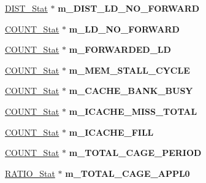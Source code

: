 \begin{DoxyCompactItemize}
\item 
\hypertarget{classall__stats__c_a616c8bd3e414d335b275bad86d8082dc}{
\hyperlink{classDIST__Stat}{DIST\_\-Stat} $\ast$ {\bfseries m\_\-DIST\_\-LD\_\-NO\_\-FORWARD}}
\label{classall__stats__c_a616c8bd3e414d335b275bad86d8082dc}

\item 
\hypertarget{classall__stats__c_aaf0c730a2a74041bd8b6f7363070812a}{
\hyperlink{classCOUNT__Stat}{COUNT\_\-Stat} $\ast$ {\bfseries m\_\-LD\_\-NO\_\-FORWARD}}
\label{classall__stats__c_aaf0c730a2a74041bd8b6f7363070812a}

\item 
\hypertarget{classall__stats__c_ad7444e5e6f9360098f9bfe9141fe182a}{
\hyperlink{classCOUNT__Stat}{COUNT\_\-Stat} $\ast$ {\bfseries m\_\-FORWARDED\_\-LD}}
\label{classall__stats__c_ad7444e5e6f9360098f9bfe9141fe182a}

\item 
\hypertarget{classall__stats__c_a40b3da12c776563c2eb95be7bd160dca}{
\hyperlink{classCOUNT__Stat}{COUNT\_\-Stat} $\ast$ {\bfseries m\_\-MEM\_\-STALL\_\-CYCLE}}
\label{classall__stats__c_a40b3da12c776563c2eb95be7bd160dca}

\item 
\hypertarget{classall__stats__c_a4ff99c146cff8aa1e8aedfa2e5ab3f8b}{
\hyperlink{classCOUNT__Stat}{COUNT\_\-Stat} $\ast$ {\bfseries m\_\-CACHE\_\-BANK\_\-BUSY}}
\label{classall__stats__c_a4ff99c146cff8aa1e8aedfa2e5ab3f8b}

\item 
\hypertarget{classall__stats__c_acfa20b6ae27d9f98561ccf504a49b5b6}{
\hyperlink{classCOUNT__Stat}{COUNT\_\-Stat} $\ast$ {\bfseries m\_\-ICACHE\_\-MISS\_\-TOTAL}}
\label{classall__stats__c_acfa20b6ae27d9f98561ccf504a49b5b6}

\item 
\hypertarget{classall__stats__c_a6996f21ad338115c6ec23be2c955cb98}{
\hyperlink{classCOUNT__Stat}{COUNT\_\-Stat} $\ast$ {\bfseries m\_\-ICACHE\_\-FILL}}
\label{classall__stats__c_a6996f21ad338115c6ec23be2c955cb98}

\item 
\hypertarget{classall__stats__c_aaf156c003e2c721eb14559cc8af72f18}{
\hyperlink{classCOUNT__Stat}{COUNT\_\-Stat} $\ast$ {\bfseries m\_\-TOTAL\_\-CAGE\_\-PERIOD}}
\label{classall__stats__c_aaf156c003e2c721eb14559cc8af72f18}

\item 
\hypertarget{classall__stats__c_abd5b8d4359cf89624e166594f05c2be0}{
\hyperlink{classRATIO__Stat}{RATIO\_\-Stat} $\ast$ {\bfseries m\_\-TOTAL\_\-CAGE\_\-APPL0}}
\label{classall__stats__c_abd5b8d4359cf89624e166594f05c2be0}


\end{DoxyCompactItemize}
